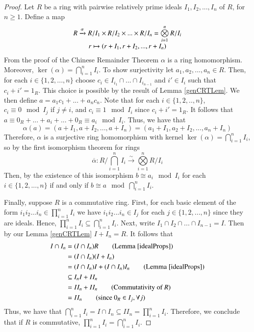 \begin{proof}
    Let $R$ be a ring with pairwise relatively prime ideals $I_1,I_2,...,I_n$ of $R$, for $n \geq 1$. Define a map $$\begin{array}{c} R\xrightarrow{\alpha} R/I_1 \times R/I_2 \times ... \times R/I_n = \bigotimes\limits_{i=1}^nR/I_i \\ r \mapsto (r+I_1, r+I_2,...,r+I_n) \end{array}$$
    From the proof of the Chinese Remainder Theorem $\alpha$ is a ring homomorphism. Moreover, $\ker(\alpha) = \bigcap\limits_{i=1}^nI_i$. To show surjectivity let $a_1,a_2,...,a_n \in R$. Then, for each $i \in \{1,2,...,n\}$ choose $c_i \in I_{i_1}\cap ... \cap I_{i_{n-1}}$ and $i' \in I_i$ such that $c_i + i' = 1_R$. This choice is possible by the result of Lemma \ref{genCRTLem}. We then define $a = a_1c_1 + ... + a_nc_n$. Note that for each $i \in \{1,2,..,n\}$, $c_i \equiv 0 \mod I_j$ if $j \neq i$, and $c_i \equiv 1 \mod I_i$ since $c_i + i' = 1_R$. It follows that $a \equiv 0_R + ... + a_i + ... + 0_R \equiv a_i \mod I_i$. Thus, we have that $$\alpha(a) = (a+I_1,a+I_2,...,a+I_n) = (a_1+I_1,a_2+I_2,...,a_n+I_n)$$ 
    Therefore, $\alpha$ is a surjective ring homomorphism with kernel $\ker(\alpha) = \bigcap\limits_{i=1}^nI_i$, so by the first isomorphism theorem for rings $$\overline{\alpha}: R/\bigcap\limits_{i=1}^n I_i \xrightarrow{\sim} \bigotimes\limits_{i=1}^nR/I_i$$
    Then, by the existence of this isomorphism $b \cong a_i \mod I_i$ for each $i \in \{1,2,...,n\}$ if and only if $b \cong a \mod \bigcap\limits_{i=1}^n I_i$. 
    
    
    Finally, suppose $R$ is a commutative ring. First, for each basic element of the form $i_1i_2...i_n \in \prod\limits_{i=1}^n I_i$ we have $i_1i_2...i_n \in I_j$ for each $j \in \{1,2,...,n\}$ since they are ideals. Hence, $\prod\limits_{i=1}^n I_i \subseteq \bigcap\limits_{i=1}^n I_i$. Next, write $I_1\cap I_2 \cap ... \cap I_{n-1} = I$. Then by our Lemma \ref{genCRTLem} $I + I_n = R$. It follows that \begin{align*}
        I \cap I_n &= (I \cap I_n)R \tag{Lemma \ref{idealProps}}\\
        &= (I\cap I_n)(I+I_n) \\
        &= (I\cap I_n)I + (I\cap I_n)I_n \tag{Lemma \ref{idealProps}} \\
        &\subseteq I_nI + II_n  \\
        &= II_n + II_n \tag{Commutativity of $R$} \\
        &= II_n \tag{since $0_R \in I_j, \forall j$} 
    \end{align*}
    Thus, we have that $\bigcap\limits_{i=1}^n I_i = I \cap I_n \subseteq II_n = \prod\limits_{i=1}^n I_i$. Therefore, we conclude that if $R$ is commutative, $\prod\limits_{i=1}^n I_i = \bigcap\limits_{i=1}^n I_i$.
\end{proof}

